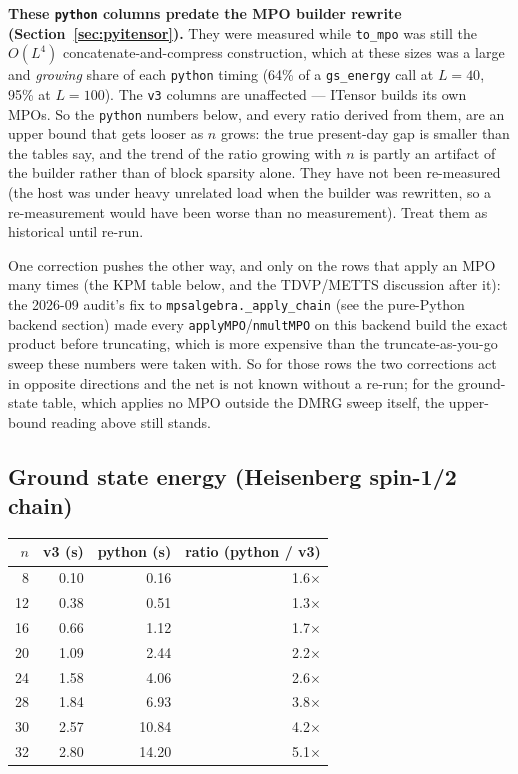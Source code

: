 \documentclass[11pt]{article}
\begin{document}
\textbf{These \texttt{python} columns predate the MPO builder rewrite
(Section~\ref{sec:pyitensor}).} They were measured while
\texttt{to\_mpo} was still the $O(L^4)$ concatenate-and-compress
construction, which at these sizes was a large and \emph{growing} share of
each \texttt{python} timing (64\% of a \texttt{gs\_energy} call at
$L=40$, 95\% at $L=100$). The \texttt{v3} columns are unaffected ---
ITensor builds its own MPOs. So the \texttt{python} numbers below, and
every ratio derived from them, are an upper bound that gets looser as $n$
grows: the true present-day gap is smaller than the tables say, and the
trend of the ratio growing with $n$ is partly an artifact of the builder
rather than of block sparsity alone. They have not been re-measured (the
host was under heavy unrelated load when the builder was rewritten, so a
re-measurement would have been worse than no measurement). Treat them as
historical until re-run.

One correction pushes the other way, and only on the rows that apply an
MPO many times (the KPM table below, and the TDVP/METTS discussion after
it): the 2026-09 audit's fix to \texttt{mpsalgebra.\_apply\_chain} (see
the pure-Python backend section) made every
\texttt{applyMPO}/\texttt{nmultMPO} on this backend build the exact
product before truncating, which is more expensive than the
truncate-as-you-go sweep these numbers were taken with. So for those rows
the two corrections act in opposite directions and the net is not known
without a re-run; for the ground-state table, which applies no MPO
outside the DMRG sweep itself, the upper-bound reading above still
stands.

\subsection{Ground state energy (Heisenberg spin-1/2 chain)}

\begin{center}
\begin{tabular}{rrrr}
\toprule
$n$ & v3 (s) & python (s) & ratio (python / v3) \\
\midrule
8  & 0.10 & 0.16  & 1.6$\times$ \\
12 & 0.38 & 0.51  & 1.3$\times$ \\
16 & 0.66 & 1.12  & 1.7$\times$ \\
20 & 1.09 & 2.44  & 2.2$\times$ \\
24 & 1.58 & 4.06  & 2.6$\times$ \\
28 & 1.84 & 6.93  & 3.8$\times$ \\
30 & 2.57 & 10.84 & 4.2$\times$ \\
32 & 2.80 & 14.20 & 5.1$\times$ \\
\bottomrule
\end{tabular}
\end{center}
\end{document}
